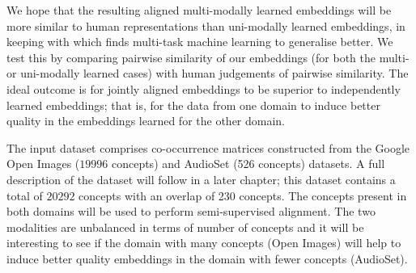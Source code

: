 We hope that the resulting aligned multi-modally learned embeddings will be more similar to human representations than uni-modally learned embeddings, in keeping with \cite{OverviewMultiTaskLearning} which finds multi-task machine learning to generalise better. We test this by comparing pairwise similarity of our embeddings (for both the multi- or uni-modally learned cases) with human judgements of pairwise similarity. The ideal outcome is for jointly aligned embeddings to be superior to independently learned embeddings; that is, for the data from one domain to induce better quality in the embeddings learned for the other domain. 

The input dataset comprises co-occurrence matrices constructed from the Google Open Images ($19996$ concepts) \cite{openimages} and AudioSet (526 concepts) \cite{audioset} datasets. A full description of the dataset will follow in a later chapter; this dataset contains a total of $20292$ concepts with an overlap of 230 concepts. The concepts present in both domains will be used to perform semi-supervised alignment. The two modalities are unbalanced in terms of number of concepts and it will be interesting to see if the domain with many concepts (Open Images) will help to induce better quality embeddings in the domain with fewer concepts (AudioSet). 











